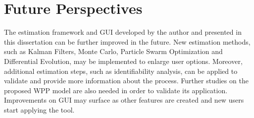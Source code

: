 \chapter{Future Perspectives}
\label{ch: Future}

The estimation framework and GUI developed by the author and presented in this dissertation can be further improved in the future. New estimation methods, such as Kalman Filters, Monte Carlo, Particle Swarm Optimization and Differential Evolution, may be implemented to enlarge user options. Moreover, additional estimation steps, such as identifiability analysis, can be applied to validate and provide more information about the process. Further studies on the proposed WPP model are also needed in order to validate its application. Improvements on GUI may surface as other features are created and new users start applying the tool.